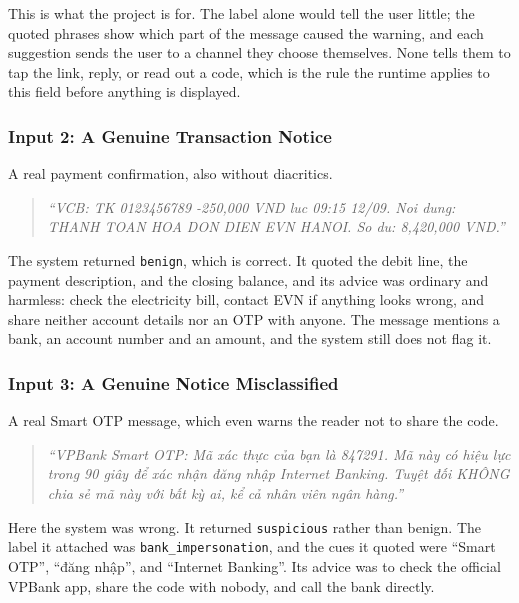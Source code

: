 \noindent This is what the project is for. The label alone would tell the user
little; the quoted phrases show which part of the message caused the warning, and
each suggestion sends the user to a channel they choose themselves. None tells
them to tap the link, reply, or read out a code, which is the rule the runtime
applies to this field before anything is displayed.

\subsubsection*{Input 2: A Genuine Transaction Notice}

A real payment confirmation, also without diacritics.

\begin{quote}\small\itshape
``VCB: TK 0123456789 -250,000 VND luc 09:15 12/09. Noi dung: THANH TOAN HOA DON DIEN EVN HANOI. So du: 8,420,000 VND.''
\end{quote}

\noindent The system returned \texttt{benign}, which is correct. It quoted the
debit line, the payment description, and the closing balance, and its advice was
ordinary and harmless: check the electricity bill, contact EVN if anything looks
wrong, and share neither account details nor an OTP with anyone. The message
mentions a bank, an account number and an amount, and the system still does not
flag it.

\subsubsection*{Input 3: A Genuine Notice Misclassified}
\label{sec:false-alarm}

A real Smart OTP message, which even warns the reader not to share the code.

\begin{quote}\small\itshape
``VPBank Smart OTP: Mã xác thực của bạn là 847291. Mã này có hiệu lực trong 90 giây để xác nhận đăng nhập Internet Banking. Tuyệt đối KHÔNG chia sẻ mã này với bất kỳ ai, kể cả nhân viên ngân hàng.''
\end{quote}

\noindent Here the system was wrong. It returned \texttt{suspicious} rather than
benign. The label it attached was \texttt{bank\_\hspace{0pt}impersonation}, and the cues it
quoted were ``Smart OTP'', ``đăng nhập'', and ``Internet Banking''. Its advice
was to check the official VPBank app, share the code with nobody, and call the
bank directly.

